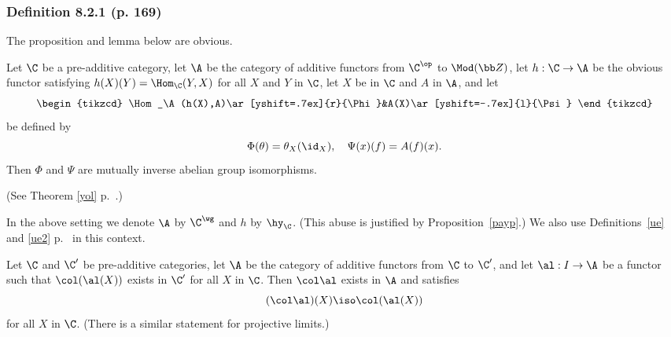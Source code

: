 \documentclass[12pt]{article}
\theoremstyle{remark}
\theoremstyle{definition}
\begin{document}





\subsubsection{Definition 8.2.1 (p. 169)}

The proposition and lemma below are obvious. 
%
\begin{prop}
Let $\C$ be a pre-additive category, let $\A$ be the category of additive functors from $\C^{\op}$ to $\Mod(\bb Z)$, let $h:\C\to\A$ be the obvious functor satisfying $h(X)(Y)=\Hom_\C(Y,X)$ for all $X$ and $Y$ in $\C$, let $X$ be in $\C$ and $A$ in $\A$, and let 
$$
\begin{tikzcd}
\Hom_\A(h(X),A)\ar[yshift=.7ex]{r}{\Phi}&A(X)\ar[yshift=-.7ex]{l}{\Psi}
\end{tikzcd}
$$
be defined by 
$$
\Phi(\theta)=\theta_X(\id_X),\quad\Psi(x)(f)=A(f)(x).
$$
Then $\Phi$ and $\Psi$ are mutually inverse abelian group isomorphisms.
\end{prop}
%
\nn(See Theorem \ref{yol} p.~.)

\begin{conv}
In the above setting we denote $\A$ by $\C^\wg$ and $h$ by $\hy_\C$. (This abuse is justified by Proposition~\ref{payp}.) We also use Definitions~\ref{ue} and \ref{ue2} p.~ in this context. 
\end{conv} 

\begin{lem}
Let $\C$ and $\C'$ be pre-additive categories, let $\A$ be the category of additive functors from $\C$ to $\C'$, and let $\al:I\to\A$ be a functor such that $\col(\al(X))$ exists in $\C'$ for all $X$ in $\C$. Then $\col\al$ exists in $\A$ and satisfies 
$$
(\col\al)(X)\iso\col(\al(X))
$$ 
for all $X$ in $\C$. (There is a similar statement for projective limits.)
\end{lem}
\end{document}
